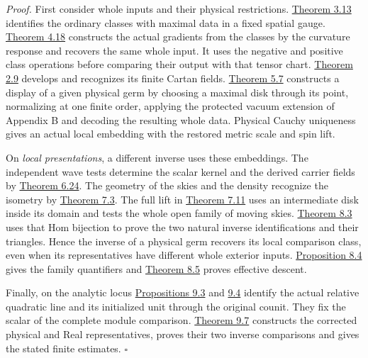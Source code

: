 \documentclass[
  english,
  11pt,
  reqno]{amsart}
\begin{document}
\emph{Proof.} First consider whole inputs and their physical
restrictions. \hyperref[thm:online-ordinary-pair-data-bijection]{Theorem
3.13} identifies the ordinary classes with maximal data in a fixed
spatial gauge.
\hyperref[thm:online-ordinary-negative-response-initial-source]{Theorem
4.18} constructs the actual gradients from the classes by the curvature
response and recovers the same whole input. It uses the negative and
positive class operations before comparing their output with that tensor
chart. \hyperref[thm:online-cartan-collar-recognition]{Theorem 2.9}
develops and recognizes its finite Cartan fields.
\hyperref[thm:submission-vacuum-germ-coverage]{Theorem 5.7} constructs a
display of a given physical germ by choosing a maximal disk through its
point, normalizing at one finite order, applying the protected vacuum
extension of Appendix B and decoding the resulting whole data. Physical
Cauchy uniqueness gives an actual local embedding with the restored
metric scale and spin lift.

On \emph{local presentations}, a different inverse uses these
embeddings. The independent wave tests determine the scalar kernel and
the derived carrier fields by
\hyperref[thm:online-wave-enrichment-recognition]{Theorem 6.24}. The
geometry of the skies and the density recognize the isometry by
\hyperref[thm:online-incidence-physical-recognition]{Theorem 7.3}. The
full lift in \hyperref[thm:online-full-unmarked-source-hom]{Theorem
7.11} uses an intermediate disk inside its domain and tests the whole
open family of moving skies. \hyperref[thm:local-two-inverses]{Theorem
8.3} uses that Hom bijection to prove the two natural inverse
identifications and their triangles. Hence the inverse of a physical
germ recovers its local comparison class, even when its representatives
have different whole exterior inputs.
\hyperref[prop:local-inverse-families]{Proposition 8.4} gives the family
quantifiers and \hyperref[thm:local-display-atlas-descent]{Theorem 8.5}
proves effective descent.

Finally, on the analytic locus
\hyperref[prop:relative-residue-calibration]{Propositions 9.3} and
\hyperref[prop:initialized-analytic-unit]{9.4} identify the actual
relative quadratic line and its initialized unit through the original
counit. They fix the scalar of the complete module comparison.
\hyperref[thm:analytic-structured-wave-comparison]{Theorem 9.7}
constructs the corrected physical and Real representatives, proves their
two inverse comparisons and gives the stated finite estimates.
\hfill\(\square\)
\end{document}
